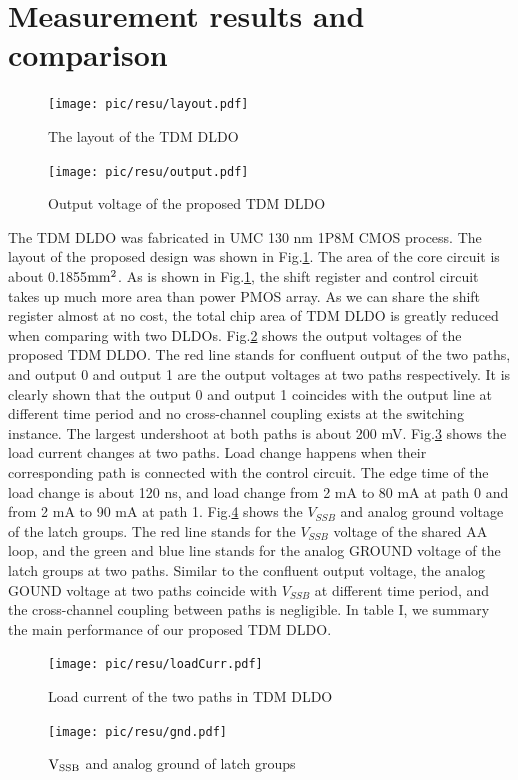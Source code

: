 \documentclass[journal]{IEEEtran}
\begin{document}
\section{Measurement results and comparison}
\begin{figure}[t!]
    \centering
    \texttt{[image: pic/resu/layout.pdf]}
    \caption{The layout of the TDM DLDO}
    \label{fig:layout}
\end{figure}
\begin{figure}[t!]
    \centering
    \texttt{[image: pic/resu/output.pdf]}
    \caption{Output voltage of the proposed TDM DLDO}
    \label{fig:output}
\end{figure}
The TDM DLDO was fabricated in UMC 130 nm 1P8M CMOS process. The layout of the proposed design was shown in Fig.\ref{fig:layout}. The area of the core circuit is about 0.1855$\rm mm^2$. As is shown in Fig.\ref{fig:layout}, the shift register and control circuit takes up much more area than power PMOS array. As we can share the shift register almost at no cost, the total chip area of TDM DLDO is greatly reduced when comparing with two DLDOs. Fig.\ref{fig:output} shows the output voltages of the proposed TDM DLDO. The red line stands for confluent output of the two paths, and output 0 and output 1 are the output voltages at two paths respectively. It is clearly shown that the output 0 and output 1 coincides with the output line at different time period and no cross-channel coupling exists at the switching instance. The largest undershoot at both paths is about 200 mV. Fig.\ref{fig:curr} shows the load current changes at two paths. Load change happens when their corresponding path is connected with the control circuit. The edge time of the load change is about 120 ns, and load change from 2 mA to 80 mA at path 0 and from 2 mA to 90 mA at path 1. Fig.\ref{fig:gnd} shows the $V_{SSB}$ and analog ground voltage of the latch groups. The red line stands for the $V_{SSB}$ voltage of the shared AA loop, and the green and blue line stands for the analog GROUND voltage of the latch groups at two paths. Similar to the confluent output voltage, the analog GOUND voltage at two paths coincide with $V_{SSB}$ at different time period, and the cross-channel coupling between paths is negligible. In table I, we summary the main performance of our proposed TDM DLDO.
\begin{figure}[t!]
    \centering
    \texttt{[image: pic/resu/loadCurr.pdf]}
    \caption{Load current of the two paths in TDM DLDO}
    \label{fig:curr}
\end{figure}
\begin{figure}[t!]
    \centering
    \texttt{[image: pic/resu/gnd.pdf]}
    \caption{$\rm V_{SSB}$ and analog ground of latch groups}
    \label{fig:gnd}
\end{figure}
\end{document}
